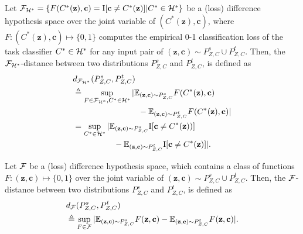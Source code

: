 \documentclass[letterpaper]{article} \usepackage{aaai20}  \usepackage{times}  \usepackage{helvet} \usepackage{courier}  \usepackage[hyphens]{url}  \usepackage{graphicx} \urlstyle{rm} \def\UrlFont{\rm}  \usepackage{graphicx}  \frenchspacing  \setlength{\pdfpagewidth}{8.5in}  \setlength{\pdfpageheight}{11in}
\begin{document}
\begin{definition}
	Let ${\cal{F}}_{{\cal{H}}^*} = \{F(C^*(\mathbf{z}), \mathbf{c} )={\rm I} [\mathbf{c} \ne C^*(\mathbf{z})] | C^* \in {\cal{H}}^* \}$ be a (loss) difference hypothesis space over the joint variable of $(C^*(\mathbf{z}), \mathbf{c})$, where $F:(C^*(\mathbf{z}), \mathbf{c}) \mapsto \{0, 1\}$ computes the empirical 0-1 classification loss of the task classifier $C^* \in {\cal{H}}^*$ for any input pair of $(\mathbf{z}, \mathbf{c}) \sim P_{Z, C}^s \cup P_{Z, C}^t$. Then, the ${\cal{F}}_{{\cal{H}}^*}$-distance between two distributions $P_{Z, C}^s$ and $P_{Z, C}^t$, is defined as 
	\begin{eqnarray}\label{EqnExpDistDiscBound1}
	\begin{aligned}
	& d_{{\cal{F}}_{{\cal{H}}^*}} (P_{Z, C}^s, P_{Z, C}^t) \\ 
	& \triangleq \sup_{F \in {\cal{F}}_{{\cal{H}}^*}, C^* \in {\cal{H}}^*} |\mathbb{E}_{(\mathbf{z}, \mathbf{c}) \sim P_{Z, C}^s} F(C^*(\mathbf{z}), \mathbf{c}) \\ & \qquad\qquad\qquad\qquad - \mathbb{E}_{(\mathbf{z}, \mathbf{c}) \sim P_{Z, C}^t} F(C^*(\mathbf{z}), \mathbf{c})| \\
	& = \sup_{C^* \in {\cal{H}}^*} |\mathbb{E}_{(\mathbf{z}, \mathbf{c}) \sim P_{Z, C}^s} {\rm I} [\mathbf{c} \ne C^*(\mathbf{z}))] \\ & \qquad\qquad\quad - \mathbb{E}_{(\mathbf{z}, \mathbf{c}) \sim P_{Z, C}^t} {\rm I} [ \mathbf{c} \ne C^*(\mathbf{z})]|. 
	\end{aligned}
	\end{eqnarray}
\end{definition}

\begin{definition}
	Let $\cal{F}$ be a (loss) difference hypothesis space, which contains a class of functions $F:(\mathbf{z},\mathbf{c}) \mapsto \{0,1\}$ over the joint variable of $(\mathbf{z}, \mathbf{c}) \sim P_{Z, C}^s \cup P_{Z, C}^t$. Then, the $\cal{F}$-distance between two distributions $P_{Z, C}^s$ and $P_{Z, C}^t$, is defined as 
	\begin{eqnarray}\label{EqnExpDistDiscBound2}
	\begin{aligned}
	& d_{\cal{F}} (P_{Z, C}^s, P_{Z, C}^t) \\ 
	& \triangleq \sup_{F \in \cal{F}} |\mathbb{E}_{(\mathbf{z}, \mathbf{c}) \sim P_{Z, C}^s} F(\mathbf{z}, \mathbf{c}) - \mathbb{E}_{(\mathbf{z}, \mathbf{c}) \sim P_{Z, C}^t} F(\mathbf{z}, \mathbf{c})|. 
	\end{aligned}
	\end{eqnarray}
\end{definition}
\end{document}
